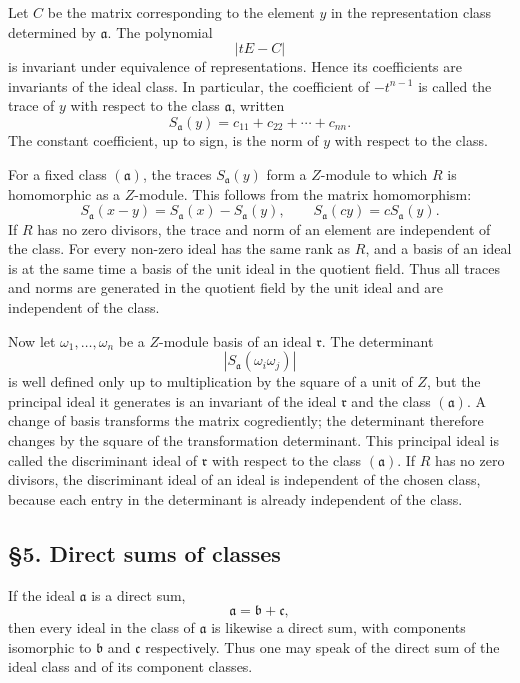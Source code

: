 \documentclass[
  12pt,
]{article}
\begin{document}
Let \(C\) be the matrix corresponding to the element \(y\) in the
representation class determined by \(\mathfrak a\). The polynomial \[
  |tE-C|
\] is invariant under equivalence of representations. Hence its
coefficients are invariants of the ideal class. In particular, the
coefficient of \(-t^{n-1}\) is called the trace of \(y\) with respect to
the class \(\mathfrak a\), written \[
  S_{\mathfrak a}(y)=c_{11}+c_{22}+
\cdots+c_{nn}.
\] The constant coefficient, up to sign, is the norm of \(y\) with
respect to the class.

For a fixed class \((\mathfrak a)\), the traces \(S_{\mathfrak a}(y)\)
form a \(Z\)-module to which \(R\) is homomorphic as a \(Z\)-module.
This follows from the matrix homomorphism: \[
  S_{\mathfrak a}(x-y)=S_{\mathfrak a}(x)-S_{\mathfrak a}(y),
  \qquad
  S_{\mathfrak a}(cy)=cS_{\mathfrak a}(y).
\] If \(R\) has no zero divisors, the trace and norm of an element are
independent of the class. For every non-zero ideal has the same rank as
\(R\), and a basis of an ideal is at the same time a basis of the unit
ideal in the quotient field. Thus all traces and norms are generated in
the quotient field by the unit ideal and are independent of the class.

Now let \(\omega_1,
\ldots,
\omega_n\) be a \(Z\)-module basis of an ideal \(\mathfrak r\). The
determinant \[
  |S_{\mathfrak a}(\omega_i\omega_j)|
\] is well defined only up to multiplication by the square of a unit of
\(Z\), but the principal ideal it generates is an invariant of the ideal
\(\mathfrak r\) and the class \((\mathfrak a)\). A change of basis
transforms the matrix cogrediently; the determinant therefore changes by
the square of the transformation determinant. This principal ideal is
called the discriminant ideal of \(\mathfrak r\) with respect to the
class \((\mathfrak a)\). If \(R\) has no zero divisors, the discriminant
ideal of an ideal is independent of the chosen class, because each entry
in the determinant is already independent of the class.

\subsection{§5. Direct sums of classes}\label{direct-sums-of-classes}

If the ideal \(\mathfrak a\) is a direct sum, \[
  \mathfrak a=\mathfrak b+\mathfrak c,
\] then every ideal in the class of \(\mathfrak a\) is likewise a direct
sum, with components isomorphic to \(\mathfrak b\) and \(\mathfrak c\)
respectively. Thus one may speak of the direct sum of the ideal class
and of its component classes.
\end{document}
